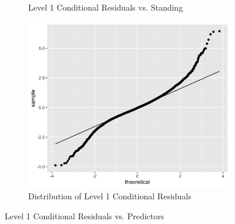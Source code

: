 \documentclass[12pt,twoside,letterpaper]{article}
\theoremstyle{definition}
\theoremstyle{definition}
\begin{document}
\begin{figure}[H]
\begin{subfigure}[b]{0.32\textwidth}
        \caption[]%
        {{\small Level 1 Conditional Residuals vs. Standing}}
        \label{fig: cond resid v stand}
        \end{subfigure}
        \hfill
        \begin{subfigure}[b]{0.32\textwidth}
            \centering
            \includegraphics[width=\textwidth]{pics/cond resid norm.png}
            \caption[]%
            {{\small Distribution of Level 1 Conditional Residuals}}
            \label{fig: cond resid qq}
            \end{subfigure}
        
    \caption[]
    {\small Level 1 Conditional Residuals vs. Predictors}
    \label{fig: cond resid v lv1}
    \end{figure}
\end{document}
